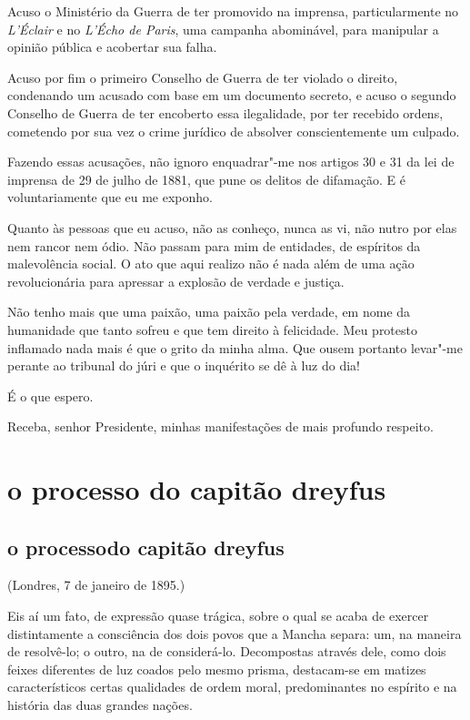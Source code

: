 Acuso o Ministério da Guerra de ter promovido na imprensa,
particularmente no \textit{L'Éclair} e no \textit{L'Écho de Paris}, uma
campanha abominável, para manipular a opinião pública e acobertar sua falha.

Acuso por fim o primeiro Conselho de Guerra de ter violado o direito,
condenando um acusado com base em um documento secreto, e acuso o segundo
Conselho de Guerra de ter encoberto essa ilegalidade, por ter recebido
ordens, cometendo por sua vez o crime jurídico de absolver conscientemente um culpado.

Fazendo essas acusações, não ignoro enquadrar"-me nos artigos 30
e 31 da lei de imprensa de 29 de julho de 1881, que pune os delitos de
difamação. E é voluntariamente que eu me exponho.

Quanto às pessoas que eu acuso, não as conheço, nunca as vi, não
nutro por elas nem rancor nem ódio. Não passam para mim de
entidades, de espíritos da malevolência social. O ato que aqui realizo
não é nada além de uma ação revolucionária para apressar a explosão de
verdade e justiça.

Não tenho mais que uma paixão, uma paixão pela verdade, em nome da humanidade que
tanto sofreu e que tem direito à felicidade. Meu protesto inflamado
nada mais é que o grito da minha alma. Que ousem portanto levar"-me perante ao tribunal do júri
e que o inquérito se dê à luz do dia! 

É o que espero.

Receba, senhor Presidente, minhas manifestações de mais profundo
respeito.

\part{o processo do capitão dreyfus}

\chapter[O processo do capitão Dreyfus,\\por Rui Barbosa]{o processo\break do capitão dreyfus}

\begin{flushright}
(Londres, 7 de janeiro de 1895.) 
\end{flushright}

Eis aí um fato, de expressão quase trágica, sobre o qual se acaba de
exercer distintamente a consciência dos dois povos que a Mancha separa:
um, na maneira de resolvê-lo; o outro, na de considerá-lo.
Decompostas através dele, como dois feixes diferentes de luz coados
pelo mesmo prisma, destacam-se em matizes característicos certas
qualidades de ordem moral, predominantes no espírito e na história das
duas grandes nações.

